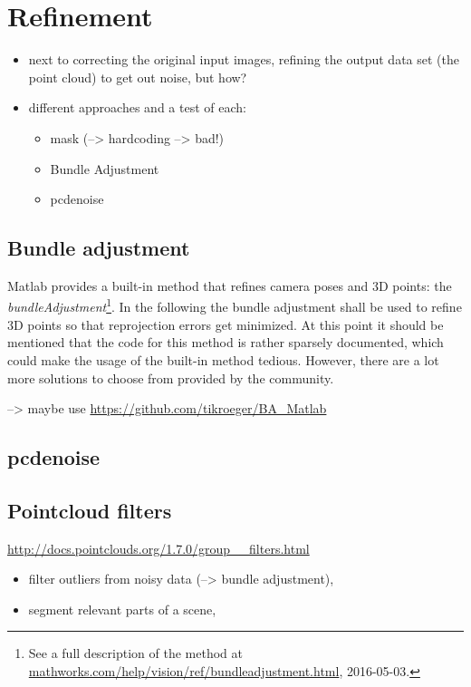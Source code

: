 \section{Refinement}\label{sec:refinement}

\begin{itemize}
\item next to correcting the original input images, refining the output data set (the point cloud) to get out noise, but how?
\item different approaches and a test of each:
  \begin{itemize}
   \item mask (--> hardcoding --> bad!)
   \item Bundle Adjustment
   \item pcdenoise
   \end{itemize}
\end{itemize}


\subsection{Bundle adjustment}
Matlab provides a built-in method that refines camera poses and 3D points: the \textit{bundleAdjustment}\footnote{See a full description of the method at \url{mathworks.com/help/vision/ref/bundleadjustment.html}, 2016-05-03.}. In the following the bundle adjustment  shall be used to refine 3D points so that reprojection errors get minimized. At this point it should be mentioned that the code for this method is rather sparsely documented, which could make the usage of the built-in method tedious. However, there are a lot more solutions to choose from provided by the community.

--> maybe use \url{https://github.com/tikroeger/BA_Matlab}




\subsection{pcdenoise}

\subsection{Pointcloud filters}
\url{http://docs.pointclouds.org/1.7.0/group__filters.html}
\begin{itemize}
\item filter outliers from noisy data (--> bundle adjustment), 
\item segment relevant parts of a scene, 
\end{itemize}

